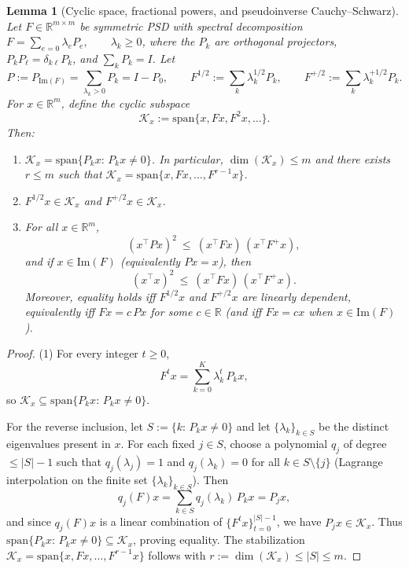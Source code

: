 \documentclass{article}
\theoremstyle{plain}
\newtheorem{lemma}{Lemma}[section]
\numberwithin{equation}{section}
\theoremstyle{definition}
\theoremstyle{remark}
\begin{document}
\begin{lemmaproofbox}
\begin{lemma}[Cyclic space, fractional powers, and pseudoinverse Cauchy--Schwarz]
\label{lemma:cyclic_cs}
Let $F\in\mathbb{R}^{m\times m}$ be symmetric PSD with spectral decomposition \(F=\sum_{e=0} \lambda_e P_e,\qquad \lambda_k\ge 0\), where the $P_k$ are orthogonal projectors, $P_kP_\ell=\delta_{k\ell}P_k$, and $\sum_k P_k=I$.
Let
\[
P:=P_{\mathrm{Im}(F)}=\sum_{\lambda_k>0}P_k=I-P_0,
\qquad
F^{1/2}:=\sum_k \lambda_k^{1/2}P_k,
\qquad
F^{+/2}:=\sum_{k}\lambda_k^{+1/2}P_k.
\]
For $x\in\mathbb{R}^m$, define the cyclic subspace
\[
\mathcal{K}_x:=\mathrm{span}\{x,Fx,F^2x,\dots\}.
\]
Then:
\begin{enumerate}
\item $\mathcal{K}_x=\mathrm{span}\{P_kx:\,P_kx\neq 0\}$. In particular, $\dim(\mathcal{K}_x)\le m$ and there exists
$r\le m$ such that $\mathcal{K}_x=\mathrm{span}\{x,Fx,\dots,F^{r-1}x\}$.
\item $F^{1/2}x\in\mathcal{K}_x$ and $F^{+/2}x\in\mathcal{K}_x$.
\item For all $x\in\mathbb{R}^m$,
\[
(x^\top Px)^2\ \le\ (x^\top Fx)\,(x^\top F^+x),
\]
and if $x\in\mathrm{Im}(F)$ (equivalently $Px=x$), then
\[
(x^\top x)^2\ \le\ (x^\top Fx)\,(x^\top F^+x).
\]
Moreover, equality holds iff $F^{1/2}x$ and $F^{+/2}x$ are linearly dependent, equivalently iff $Fx=c\,Px$ for some
$c\in\mathbb{R}$ (and iff $Fx=cx$ when $x\in\mathrm{Im}(F)$).
\end{enumerate}
\end{lemma}

\begin{proof}
(1) For every integer $t\ge 0$,
\[
F^t x=\sum_{k=0}^K \lambda_k^t\,P_kx,
\]
so $\mathcal{K}_x\subseteq \mathrm{span}\{P_kx:\,P_kx\neq 0\}$.

For the reverse inclusion, let $S:=\{k:\,P_kx\neq 0\}$ and let $\{\lambda_k\}_{k\in S}$ be the distinct eigenvalues
present in $x$. For each fixed $j\in S$, choose a polynomial $q_j$ of degree $\le |S|-1$ such that
$q_j(\lambda_j)=1$ and $q_j(\lambda_k)=0$ for all $k\in S\setminus\{j\}$ (Lagrange interpolation on the finite set
$\{\lambda_k\}_{k\in S}$). Then
\[
q_j(F)x=\sum_{k\in S} q_j(\lambda_k)\,P_kx = P_jx,
\]
and since $q_j(F)x$ is a linear combination of $\{F^t x\}_{t=0}^{|S|-1}$, we have $P_jx\in\mathcal{K}_x$.
Thus $\mathrm{span}\{P_kx:\,P_kx\neq 0\}\subseteq \mathcal{K}_x$, proving equality. The stabilization
$\mathcal{K}_x=\mathrm{span}\{x,Fx,\dots,F^{r-1}x\}$ follows with $r:=\dim(\mathcal{K}_x)\le |S|\le m$.


\end{proof}
\end{lemmaproofbox}
\end{document}
